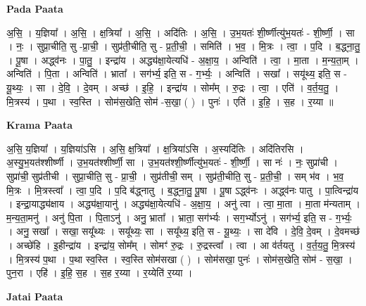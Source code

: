 \documentclass[17pt]{extarticle}
\begin{document}
\textbf{Pada Paata} \newline

अ॒सि॒ । य॒ज्ञिया᳚ । अ॒सि॒ । क्ष॒त्रिया᳚ । अ॒सि॒ । अदि॑तिः । अ॒सि॒ । उ॒भ॒यतः॑ शी॒र्ष्णीत्यु॑भ॒यतः॑ - शी॒र्ष्णी॒ । सा । नः॒ । सुप्रा॒चीति॒ सु -प्रा॒ची॒ । सुप्र॑ती॒चीति॒ सु - प्र॒ती॒ची॒ । समिति॑ । भ॒व॒ । मि॒त्रः । त्वा॒ । प॒दि । ब॒द्ध्ना॒तु॒ । पू॒षा । अद्ध्व॑नः । पा॒तु॒ । इन्द्रा॑य । अद्ध्य॑क्षा॒येत्यधि॑ - अ॒क्षा॒य॒ । अन्विति॑ । त्वा॒ । मा॒ता । म॒न्य॒ता॒म् । अन्विति॑ । पि॒ता । अन्विति॑ । भ्राता᳚ । सग॑र्भ्य॒ इति॒ स - ग॒र्भ्यः॒ । अन्विति॑ । सखा᳚ । सयू॑थ्य॒ इति॒ स - यू॒थ्यः॒ । सा । दे॒वि॒ । दे॒वम् । अच्छ॑ । इ॒हि॒ । इन्द्रा॑य । सोम᳚म् । रु॒द्रः । त्वा॒ । एति॑ । व॒र्त॒य॒तु॒ । मि॒त्रस्य॑ । प॒था । स्व॒स्ति । सोम॑स॒खेति॒ सोम॑ -स॒खा॒ ( ) । पुनः॑ । एति॑ । इ॒हि॒ । स॒ह । र॒य्या ॥  \newline


\textbf{Krama Paata} \newline

अ॒सि॒ य॒ज्ञिया᳚ । य॒ज्ञिया॑ऽसि । अ॒सि॒ क्ष॒त्रिया᳚ । क्ष॒त्रिया॑ऽसि । अ॒स्यदि॑तिः । अदि॑तिरसि । अ॒स्यु॒भ॒यत॑श्शीर्ष्णी । उ॒भ॒यत॑श्शीर्ष्णी॒ सा । उ॒भ॒यत॑श्शी॒र्ष्णीत्यु॑भ॒यतः॑ - शी॒र्ष्णी॒ । सा नः॑ । नः॒ सुप्रा॑ची । सुप्रा॑ची॒ सुप्र॑तीची । सुप्रा॒चीति॒ सु - प्रा॒ची॒ । सुप्र॑तीची॒ सम् । सुप्र॑ती॒चीति॒ सु - प्र॒ती॒ची॒ । सम् भ॑व । भ॒व॒ मि॒त्रः । मि॒त्रस्त्वा᳚ । त्वा॒ प॒दि । प॒दि ब॑द्ध्नातु । ब॒द्ध्ना॒तु॒ पू॒षा । पू॒षा ऽद्ध्व॑नः । अद्ध्व॑नः पातु । पा॒त्विन्द्रा॑य । इन्द्रा॒याद्ध्य॑क्षाय । अद्ध्य॑क्षा॒यानु॑ । अद्ध्य॑क्षा॒येत्यधि॑ - अ॒क्षा॒य॒ । अनु॑ त्वा । त्वा॒ मा॒ता । मा॒ता म॑न्यताम् । म॒न्य॒ता॒मनु॑ । अनु॑ पि॒ता । पि॒ताऽनु॑ । अनु॒ भ्राता᳚ । भ्राता॒ सग॑र्भ्यः । सग॒र्भ्योऽनु॑ । सग॑र्भ्य॒ इति॒ स - ग॒र्भ्यः॒ । अनु॒ सखा᳚ । सखा॒ सयू᳚थ्यः । सयू᳚थ्यः॒ सा । सयू᳚थ्य॒ इति॒ स - यू॒थ्यः॒ । सा दे॑वि । दे॒वि॒ दे॒वम् । दे॒वमच्छ॑ । अच्छे॑हि । इ॒हीन्द्रा॑य । इन्द्रा॑य॒ सोम᳚म् । सोमꣳ॑ रु॒द्रः । रु॒द्रस्त्वा᳚ । त्वा । आ व॑र्तयतु । व॒र्त॒य॒तु॒ मि॒त्रस्य॑ । मि॒त्रस्य॑ प॒था । प॒था स्व॒स्ति । स्व॒स्ति सोम॑सखा ( ) । सोम॑सखा॒ पुनः॑ । सोम॑स॒खेति॒ सोम॑ - स॒खा॒ । पुन॒रा । एहि॑ । इ॒हि॒ स॒ह । स॒ह र॒य्या । र॒य्येति॑ र॒य्या । \newline

\textbf{Jatai Paata} \newline
\end{document}
